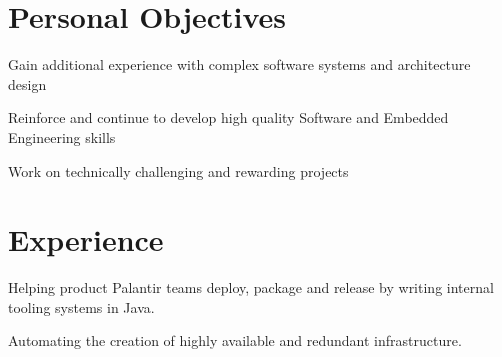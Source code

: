 \documentclass[letterpaper]{deedy-resume} %
\begin{document}
\hfill
%
%
\begin{minipage}[t]{0.66\textwidth} %


\section{Personal Objectives}
\vspace{\topsep} %
\begin{tightitemize}
\item Gain additional experience with complex software systems and architecture design
\item Reinforce and continue to develop high quality Software and Embedded Engineering skills
\item Work on technically challenging and rewarding projects
\end{tightitemize}


\section{Experience}


\begin{tightitemize}
\item Helping product Palantir teams deploy, package and release by writing internal tooling systems in Java.
\item Automating the creation of highly available and redundant infrastructure.
\end{tightitemize}

\sectionspace %


\end{minipage}
\end{document}
